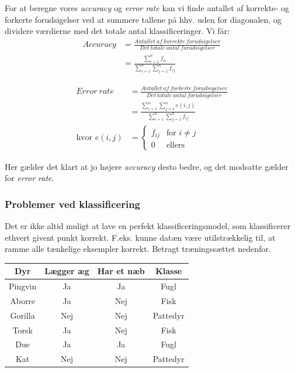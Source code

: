 \documentclass{article}
\begin{document}
For at beregne vores \textit{accuracy} og \textit{error rate} kan vi finde antallet af korrekte- og forkerte forudsigelser ved at summere tallene på hhv. uden for diagonalen, og dividere værdierne med det totale antal klassificeringer. Vi får:\\

\begin{align*}
Accuracy &= \frac{Antallet \ af \ korrekte \ forudsigelser}{Det \ totale \ antal \ forudsigelser} \\
         &= \frac{\sum_{i=1}^{n}f_{ii}}{\sum_{i=1}^{n}\sum_{j=1}^{n}f_{ij}}
\end{align*}

\begin{align*}
Error \ rate &= \frac{Antallet \ af \ forkerte \ forudsigelser}{Det \ totale \ antal \ forudsigelser} \\
           &= \frac{\sum_{i=1}^{n}\sum_{j=1}^{n}e(i,j)}{\sum_{i=1}^{n}\sum_{j=1}^{n}f_{ij}}\\
           \text{hvor }e(i,j)&=
           \begin{cases} f_{ij} & \text{for } i\neq j \\
           0                                    & \text{ellers}      %
           \end{cases}
\end{align*}


Her gælder det klart at jo højere \textit{accuracy} desto bedre, og det modsatte gælder for \textit{error rate}. \\

\subsubsection{Problemer ved klassificering}
Det er ikke altid muligt at lave en perfekt klassificeringsmodel, som klassificerer ethvert givent punkt korrekt. F.eks. kunne datæn være utilstrækkelig til, at ramme alle tænkelige eksempler korrekt. Betragt træningssættet nedenfor. 

\begin{tabular}{c|c|c|c}
	Dyr & Lægger æg & Har et næb & Klasse\\
	\hline
	Pingvin & Ja & Ja & Fugl\\
	Aborre & Ja & Nej & Fisk\\
	Gorilla & Nej & Nej & Pattedyr\\
	Torsk & Ja & Nej & Fisk\\
	Due & Ja & Ja & Fugl\\
	Kat & Nej & Nej & Pattedyr
\end{tabular}
\end{document}

